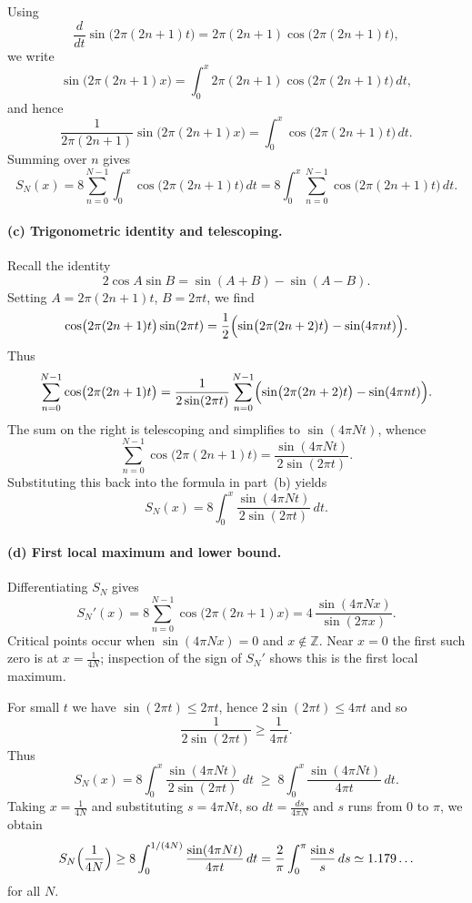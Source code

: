 \documentclass[12pt,a4paper]{article}
\theoremstyle{plain}
\theoremstyle{definition}
\theoremstyle{remark}
\theoremstyle{remark}
\begin{document}
Using
\[
\frac{d}{dt}\sin\bigl(2\pi(2n+1)t\bigr)
= 2\pi(2n+1)\cos\bigl(2\pi(2n+1)t\bigr),
\]
we write
\[
\sin\bigl(2\pi(2n+1)x\bigr)
= \int_0^x 2\pi(2n+1)
\cos\bigl(2\pi(2n+1)t\bigr)\,dt,
\]
and hence
\[
\frac{1}{2\pi(2n+1)}\sin\bigl(2\pi(2n+1)x\bigr)
= \int_0^x \cos\bigl(2\pi(2n+1)t\bigr)\,dt.
\]
Summing over $n$ gives
\[
S_N(x)
= 8\sum_{n=0}^{N-1}\int_0^x
\cos\bigl(2\pi(2n+1)t\bigr)\,dt
= 8\int_0^x \sum_{n=0}^{N-1}
\cos\bigl(2\pi(2n+1)t\bigr)\,dt.
\]

\bigskip
\paragraph{(c) Trigonometric identity and telescoping.}

Recall the identity
\[
2\cos A\sin B = \sin(A+B)-\sin(A-B).
\]
Setting $A=2\pi(2n+1)t$, $B=2\pi t$, we find
\[
\cos\bigl(2\pi(2n+1)t\bigr)\sin(2\pi t)
= \frac12\Bigl(\sin\bigl(2\pi(2n+2)t\bigr)
-\sin(4\pi n t)\Bigr).
\]
Thus
\[
\sum_{n=0}^{N-1}\cos\bigl(2\pi(2n+1)t\bigr)
= \frac{1}{2\sin(2\pi t)}
\sum_{n=0}^{N-1}
\Bigl(\sin\bigl(2\pi(2n+2)t\bigr)
-\sin(4\pi n t)\Bigr).
\]
The sum on the right is telescoping and simplifies to $\sin(4\pi N t)$,
whence
\[
\sum_{n=0}^{N-1}\cos\bigl(2\pi(2n+1)t\bigr)
= \frac{\sin(4\pi N t)}{2\sin(2\pi t)}.
\]
Substituting this back into the formula in part~(b) yields
\[
S_N(x)
= 8\int_0^x \frac{\sin(4\pi N t)}{2\sin(2\pi t)}\,dt.
\]

\bigskip
\paragraph{(d) First local maximum and lower bound.}

Differentiating $S_N$ gives
\[
S_N'(x)
= 8\sum_{n=0}^{N-1}\cos\bigl(2\pi(2n+1)x\bigr)
= 4\,\frac{\sin(4\pi N x)}{\sin(2\pi x)}.
\]
Critical points occur when $\sin(4\pi N x)=0$ and $x\notin\mathbb{Z}$.
Near $x=0$ the first such zero is at $x=\tfrac{1}{4N}$; inspection of
the sign of $S_N'$ shows this is the first local maximum.

For small $t$ we have $\sin(2\pi t)\le 2\pi t$, hence
$2\sin(2\pi t)\le 4\pi t$ and so
\[
\frac{1}{2\sin(2\pi t)} \ge \frac{1}{4\pi t}.
\]
Thus
\[
S_N(x)
= 8\int_0^x \frac{\sin(4\pi N t)}{2\sin(2\pi t)}\,dt
\;\ge\;
8\int_0^x \frac{\sin(4\pi N t)}{4\pi t}\,dt.
\]
Taking $x=\tfrac{1}{4N}$ and substituting $s=4\pi N t$, so
$dt = \tfrac{ds}{4\pi N}$ and $s$ runs from $0$ to $\pi$, we obtain
\[
S_N\Bigl(\frac{1}{4N}\Bigr)
\ge 8\int_0^{1/(4N)} \frac{\sin(4\pi N t)}{4\pi t}\,dt
= \frac{2}{\pi}\int_0^{\pi} \frac{\sin s}{s}\,ds
\simeq 1.179\ldots
\]
for all $N$.
\end{document}
